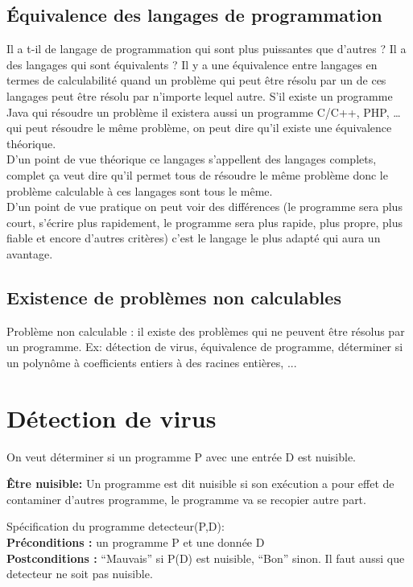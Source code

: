 	\subsection{ Équivalence des langages de programmation}
	 Il a t-il de langage de programmation qui sont plus puissantes que d'autres ?  Il a des langages qui sont équivalents ? 
	\newline Il y a une équivalence entre langages en termes de calculabilité quand un problème qui peut être résolu par un de ces langages peut être résolu par n'importe lequel autre.   
S'il existe un programme Java qui résoudre un problème il existera aussi un programme C/C++, PHP, … qui peut résoudre le même problème, on peut dire qu'il existe une équivalence théorique.\\
 D'un point de vue théorique ce langages s'appellent des langages complets, complet ça veut dire qu'il permet tous de résoudre le même problème donc le problème calculable à ces langages sont tous le même.\\
D'un point de vue pratique on peut voir des différences (le programme sera plus court, s'écrire plus rapidement, le programme sera plus rapide, plus propre, plus fiable et encore d'autres critères) c'est le langage le plus adapté qui aura un avantage. 


	\subsection{Existence de problèmes non calculables}
	Problème non calculable : il existe des problèmes qui ne peuvent
		être résolus par un programme. Ex:
        détection de virus,
        équivalence de programme,
        déterminer si un polynôme à coefficients entiers à des racines entières, ...
	



\section{Détection de virus}
\label{sec:d_tection_de_virus}
On veut déterminer si un programme P avec une entrée D est nuisible.

\textbf{Être nuisible:} Un programme est dit nuisible si son exécution a pour effet de contaminer d'autres programme, le programme va se recopier autre part. 

Spécification du programme detecteur(P,D):\\
\textbf{Préconditions :} un programme P et une donnée D\\
\textbf{Postconditions :} ``Mauvais'' si P(D) est nuisible,
		``Bon'' sinon.
Il faut aussi que detecteur ne soit pas nuisible.

